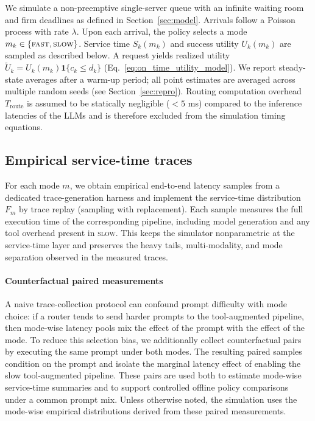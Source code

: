 \documentclass[fleqn,12pt,lineno]{wlpeerj}
\begin{document}
We simulate a non-preemptive single-server queue with an infinite waiting room and firm deadlines as defined in Section~\ref{sec:model}. Arrivals follow a Poisson process with rate $\lambda$. Upon each arrival, the policy selects a mode $m_k \in \{\textsc{fast},\textsc{slow}\}$. Service time $S_k(m_k)$ and success utility $U_k(m_k)$ are sampled as described below. A request yields realized utility $\tilde{U}_k = U_k(m_k)\mathbf{1}\{c_k \le d_k\}$ (Eq.~\eqref{eq:on_time_utility_model}). We report steady-state averages after a warm-up period; all point estimates are averaged across multiple random seeds (see Section~\ref{sec:repro}). Routing computation overhead $T_{\text{route}}$ is assumed to be statically negligible ($< 5$ ms) compared to the inference latencies of the LLMs and is therefore excluded from the simulation timing equations.

\subsection{Empirical service-time traces}
\label{sec:service_traces}

For each mode $m$, we obtain empirical end-to-end latency samples from a dedicated trace-generation harness and implement the service-time distribution $F_m$ by trace replay (sampling with replacement). Each sample measures the full execution time of the corresponding pipeline, including model generation and any tool overhead present in \textsc{slow}. This keeps the simulator nonparametric at the service-time layer and preserves the heavy tails, multi-modality, and mode separation observed in the measured traces.

\paragraph{Counterfactual paired measurements}
A naive trace-collection protocol can confound prompt difficulty with mode choice: if a router tends to send harder prompts to the tool-augmented pipeline, then mode-wise latency pools mix the effect of the prompt with the effect of the mode. To reduce this selection bias, we additionally collect counterfactual pairs by executing the same prompt under both modes. The resulting paired samples condition on the prompt and isolate the marginal latency effect of enabling the slow tool-augmented pipeline. These pairs are used both to estimate mode-wise service-time summaries and to support controlled offline policy comparisons under a common prompt mix. Unless otherwise noted, the simulation uses the mode-wise empirical distributions derived from these paired measurements.
\end{document}
